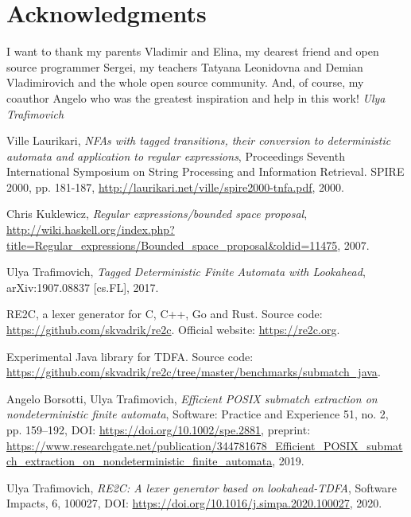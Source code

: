 \documentclass[]{article}
\begin{document}
\section*{Acknowledgments}

I want to thank my parents Vladimir and Elina,
my dearest friend and open source programmer Sergei,
my teachers Tatyana Leonidovna and Demian Vladimirovich
and the whole open source community.
And, of course, my coauthor Angelo who was the greatest inspiration and help in this work!
\null\hfill\textit{Ulya Trafimovich}

\pagebreak

\begin{thebibliography}{99}

    Ville Laurikari,
    \textit{NFAs with tagged transitions, their conversion to deterministic automata and application to regular expressions},
    Proceedings Seventh International Symposium on String Processing and Information Retrieval. SPIRE 2000,
    pp. 181-187,
    \url{http://laurikari.net/ville/spire2000-tnfa.pdf},
    2000.

    Chris Kuklewicz,
    \textit{Regular expressions/bounded space proposal},
    \url{http://wiki.haskell.org/index.php?title=Regular_expressions/Bounded_space_proposal&oldid=11475},
    2007.

    Ulya Trafimovich,
    \textit{Tagged Deterministic Finite Automata with Lookahead},
    arXiv:1907.08837 [cs.FL],
    2017.

    RE2C, a lexer generator for C, C++, Go and Rust.
    Source code: \url{https://github.com/skvadrik/re2c}.
    Official website: \url{https://re2c.org}.

    Experimental Java library for TDFA.
    Source code: \url{https://github.com/skvadrik/re2c/tree/master/benchmarks/submatch_java}.

    Angelo Borsotti, Ulya Trafimovich,
    \textit{Efficient POSIX submatch extraction on nondeterministic finite automata},
    Software: Practice and Experience 51, no. 2, pp. 159--192,
    DOI: \url{https://doi.org/10.1002/spe.2881},
    preprint: \url{https://www.researchgate.net/publication/344781678_Efficient_POSIX_submatch_extraction_on_nondeterministic_finite_automata},
    2019.

    Ulya Trafimovich,
    \textit{RE2C: A lexer generator based on lookahead-TDFA},
    Software Impacts, 6, 100027,
    DOI: \url{https://doi.org/10.1016/j.simpa.2020.100027},
    2020.


\end{thebibliography}
\end{document}
